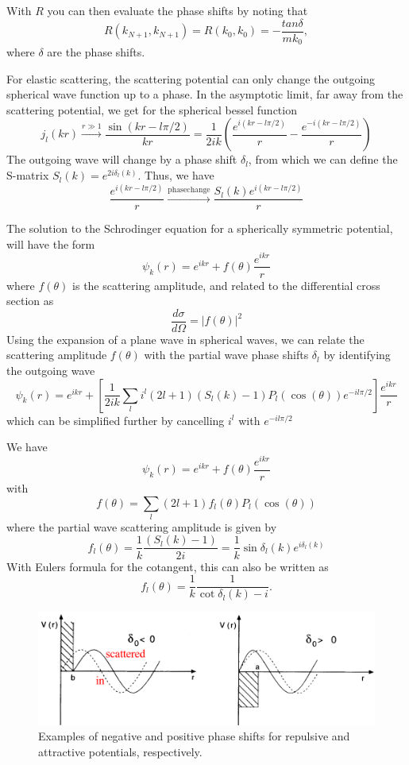 \documentclass[%
oneside,                 %
final,                   %
10pt]{article}
\begin{document}
With $R$ you can then evaluate the phase shifts
by noting that 
\[
      R(k_{N+1},k_{N+1})=R(k_0,k_0)=-\frac{tan\delta}{mk_0},
\]
where $\delta$ are the phase shifts.

For elastic scattering, the scattering potential can only change the outgoing spherical wave function up to a phase. In the asymptotic limit, far away from the scattering potential, we get for the spherical bessel function
\[
j_l(kr) \xrightarrow[]{ r \gg 1} \frac{\sin(kr -l\pi/2)}{kr} =  \frac{1}{2ik}\left( \frac{e^{i(kr-l\pi/2)}}{r} - \frac{e^{-i(kr-l\pi/2)}}{r}\right)
\]
The outgoing wave will change by a phase shift $\delta_l$, from which we can define the S-matrix $S_l(k) = e^{2i\delta_l(k)}$. Thus, we have
\[
 \frac{e^{i(kr-l\pi/2)}}{r} \xrightarrow[]{\mathrm{phase change}}  \frac{S_l(k)e^{i(kr-l\pi/2)}}{r}
\]

The solution to the Schrodinger equation for a spherically symmetric potential, will have the form
\[
\psi_k(r) = e^{ikr} + f(\theta)\frac{e^{ikr}}{r}
\]
where $f(\theta)$ is the scattering amplitude, and related to the differential cross section as
\[
\frac{d\sigma}{d\Omega} = |f(\theta)|^2
\]
Using the expansion of a plane wave in spherical waves, we can relate the scattering amplitude $f(\theta)$ with the partial wave phase shifts $\delta_l$ by identifying the outgoing wave 
\[
\psi_k(r) = e^{ikr} + \left[\frac{1}{2ik}\sum_l i^l (2l+1) (S_l(k)-1)P_l(\cos(\theta))e^{-il\pi/2}\right] \frac{e^{ikr}}{r}
\]
which can be simplified further by cancelling $i^l$ with $e^{-il\pi/2}$ 

We have
\[
\psi_k(r) = e^{ikr} + f(\theta) \frac{e^{ikr}}{r}
\]
with 
\[
f(\theta) = \sum_l (2l+1)f_l(\theta) P_l(\cos(\theta))
\]
where the partial wave scattering amplitude is given by
\[
f_l(\theta) = \frac{1}{k}\frac{(S_l(k)-1)}{2i} = \frac{1}{k}\sin\delta_l(k) e^{i\delta_l(k)}
\]
With Eulers formula for the cotangent, this can also be written as
\[
f_l(\theta) = \frac{1}{k}\frac{1}{\cot \delta_l(k) - i}.
\]


\begin{figure}[t]
  \centerline{\includegraphics[width=0.7\linewidth]{fig-forces/phase.png}}
  \caption{
  Examples of negative and positive phase shifts for repulsive and attractive potentials, respectively.
  }
\end{figure}
\end{document}
